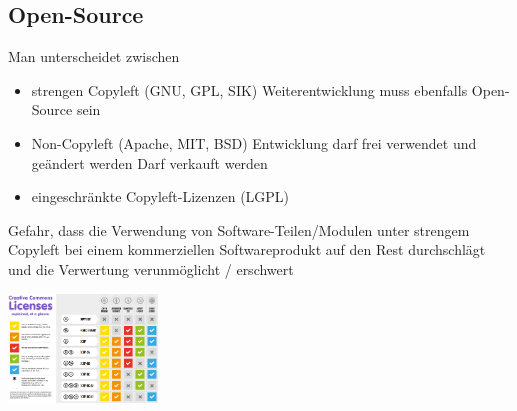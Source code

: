 \documentclass{report}
\newenvironment{Figure}
	{\par\medskip\noindent\minipage{\linewidth}}
	{\endminipage\par\medskip}
\theoremstyle{definition}
\theoremstyle{example}
\begin{document}
\subsection{Open-Source}
Man unterscheidet zwischen
\begin{itemize}
   \item strengen Copyleft (GNU, GPL, SIK)
   \subitem Weiterentwicklung muss ebenfalls Open-Source sein
   \item Non-Copyleft (Apache, MIT, BSD) 
   \subitem Entwicklung darf frei verwendet und geändert werden
   \subitem Darf verkauft werden
   \item eingeschränkte Copyleft-Lizenzen (LGPL) 
\end{itemize}

Gefahr, dass die Verwendung von Software-Teilen/Modulen unter strengem Copyleft bei einem kommerziellen Softwareprodukt auf den Rest durchschlägt und die Verwertung verunmöglicht / erschwert

\begin{Figure}
   \centering
    \includegraphics[width=150px]{img/OpenSource.png}
        \label{fig:Abbildung Lizenzierungen}
\end{Figure}
\end{document}
